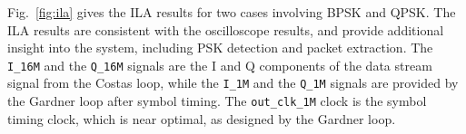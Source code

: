 \documentclass[journal,twoside]{IEEEtran}
\begin{document}

    Fig.~\ref{fig:ila} gives the ILA results for two cases involving BPSK and QPSK.
    The ILA results are consistent with the oscilloscope results,
    and provide additional insight into the system, including PSK detection and packet extraction.
    The \texttt{I\_16M} and the \texttt{Q\_16M} signals are the I and Q components of the data stream signal from the Costas loop,
    while the \texttt{I\_1M} and the \texttt{Q\_1M} signals are provided by the Gardner loop after symbol timing.
    The \texttt{out\_clk\_1M} clock is the symbol timing clock, which is near optimal, as designed by the Gardner loop.
\end{document}
